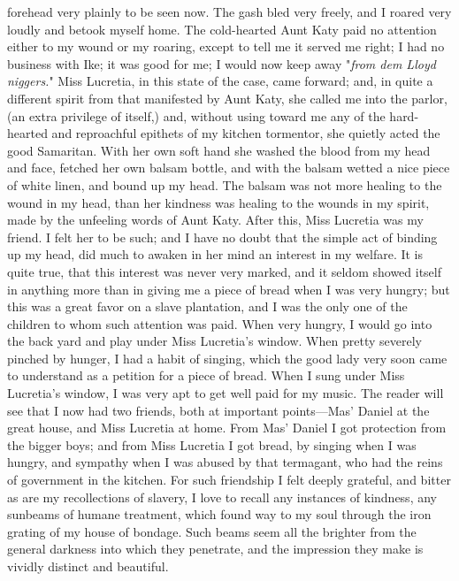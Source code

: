 forehead very plainly to be seen now. The gash bled very freely, and I
roared very loudly and betook myself home. The cold-hearted Aunt Katy
paid no attention either to my wound or my roaring, except to tell me it
served me right; I had no business with Ike; it was good for me; I would
now keep away "\emph{from dem Lloyd niggers.}" Miss Lucretia, in this
state of the case, came forward; and, in quite a different spirit from
that manifested by Aunt Katy, she called me into the parlor, (an extra
privilege of itself,) and, without using toward me any of the
hard-hearted and reproachful epithets of my kitchen tormentor, she
quietly acted the good Samaritan. With her own soft hand she washed the
blood from my head and face, fetched her own balsam bottle, and with the
balsam wetted a nice piece of white
{\protect\hypertarget{131}{}{}}linen, and bound up my head. The balsam
was not more healing to the wound in my head, than her kindness was
healing to the wounds in my spirit, made by the unfeeling words of Aunt
Katy. After this, Miss Lucretia was my friend. I felt her to be such;
and I have no doubt that the simple act of binding up my head, did much
to awaken in her mind an interest in my welfare. It is quite true, that
this interest was never very marked, and it seldom showed itself in
anything more than in giving me a piece of bread when I was very hungry;
but this was a great favor on a slave plantation, and I was the only one
of the children to whom such attention was paid. When very hungry, I
would go into the back yard and play under Miss Lucretia's window. When
pretty severely pinched by hunger, I had a habit of singing, which the
good lady very soon came to understand as a petition for a piece of
bread. When I sung under Miss Lucretia's window, I was very apt to get
well paid for my music. The reader will see that I now had two friends,
both at important points---Mas' Daniel at the great house, and Miss
Lucretia at home. From Mas' Daniel I got protection from the bigger
boys; and from Miss Lucretia I got bread, by singing when I was hungry,
and sympathy when I was abused by that termagant, who had the reins of
government in the kitchen. For such friendship I felt deeply grateful,
and bitter as are my recollections of slavery, I love to recall any
instances of kindness, any sunbeams of humane treatment, which found way
to my soul through the iron grating of my house of bondage. Such beams
seem all the brighter from {\protect\hypertarget{132}{}{}}the general
darkness into which they penetrate, and the impression they make is
vividly distinct and beautiful.


